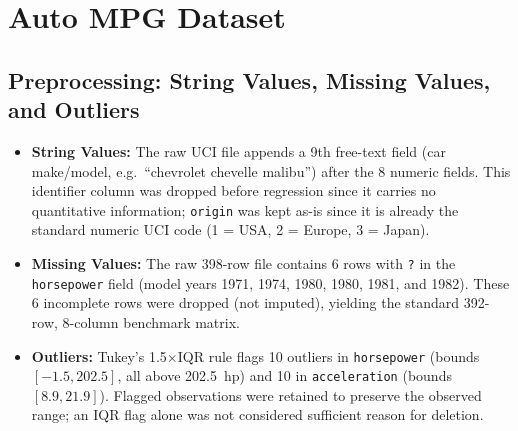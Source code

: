 
\section{Auto MPG Dataset}

\subsection{Preprocessing: String Values, Missing Values, and Outliers}
\begin{itemize}
    \item \textbf{String Values:} The raw UCI file appends a 9th free-text field (car make/model, e.g.\ ``chevrolet chevelle malibu'') after the 8 numeric fields. This identifier column was dropped before regression since it carries no quantitative information; \texttt{origin} was kept as-is since it is already the standard numeric UCI code (1 = USA, 2 = Europe, 3 = Japan).
    \item \textbf{Missing Values:} The raw 398-row file contains 6 rows with \texttt{?} in the \texttt{horsepower} field (model years 1971, 1974, 1980, 1980, 1981, and 1982). These 6 incomplete rows were dropped (not imputed), yielding the standard 392-row, 8-column benchmark matrix.
    \item \textbf{Outliers:} Tukey's 1.5$\times$IQR rule flags 10 outliers in \texttt{horsepower} (bounds $[-1.5, 202.5]$, all above 202.5~hp) and 10 in \texttt{acceleration} (bounds $[8.9, 21.9]$). Flagged observations were retained to preserve the observed range; an IQR flag alone was not considered sufficient reason for deletion.
\end{itemize}

